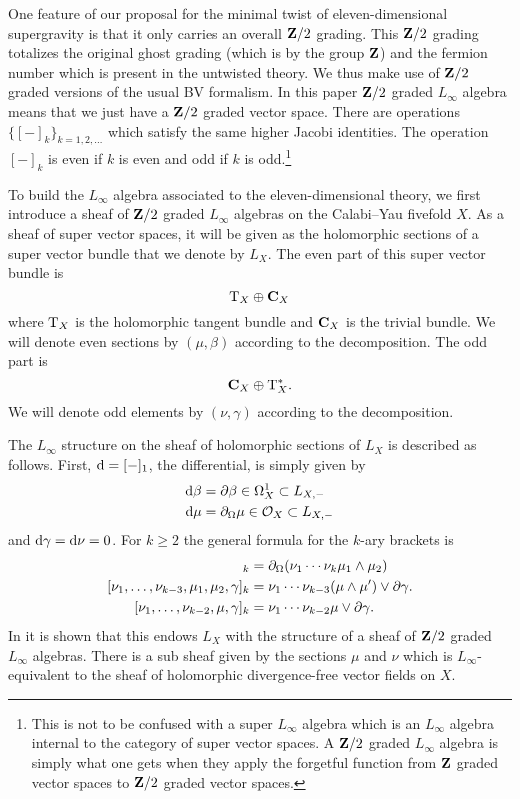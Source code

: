 One feature of our proposal for the minimal twist of eleven-dimensional supergravity is that it only carries an overall $\mathbf{Z}/2$ grading. 
This $\mathbf{Z}/2$ grading totalizes the original ghost grading (which is by the group $\mathbf{Z}$) and the fermion number which is present in the untwisted theory.
We thus make use of $\mathbf{Z}/2$ graded versions of the usual BV formalism.
In this paper $\mathbf{Z}/2$ graded $L_\infty$ algebra means that we just have a $\mathbf{Z}/2$ graded vector space.
There are operations $\{[-]_k\}_{k = 1,2,\ldots}$ which satisfy the same higher Jacobi identities.
The operation $[-]_k$ is even if $k$ is even and odd if $k$ is odd.\footnote{This is not to be confused with a super $L_\infty$ algebra which is an $L_\infty$ algebra internal to the category of super vector spaces.
A $\mathbf{Z}/2$ graded $L_\infty$ algebra is simply what one gets when they apply the forgetful function from $\mathbf{Z}$ graded vector spaces to $\mathbf{Z}/2$ graded vector spaces.}

To build the $L_\infty$ algebra associated to the eleven-dimensional theory, we first introduce a sheaf of $\mathbf{Z}/2$ graded $L_\infty$ algebras on the Calabi--Yau fivefold $X$.
As a sheaf of super vector spaces, it will be given as the holomorphic sections of a super vector bundle that we denote by $L_X$. 
The even part of this super vector bundle is
\[
{\rm T}_X \oplus \mathbf{C}_X 
\]
where ${\rm T}_X$ is the holomorphic tangent bundle and $\mathbf{C}_X$ is the trivial bundle.
We will denote even sections by $(\mu, \beta)$ according to the decomposition. 
The odd part is 
\[
\mathbf{C}_X \oplus {\rm T}^*_X .
\]
We will denote odd elements by $(\nu, \gamma)$ according to the decomposition. 

The $L_\infty$ structure on the sheaf of holomorphic sections of $L_X$ is described as follows. 
First, ${\rm d} = [-]_1$, the differential, is simply given by 
\begin{align*}
{\rm d} \beta & = \partial \beta \in \Omega^1_X \subset L_{X,-} \\
{\rm d} \mu & = \partial_{\Omega} \mu \in \mathcal O_X \subset L_{X, -}
\end{align*}
and ${\rm d} \gamma = {\rm d} \nu = 0$. 
For $k \geq 2$ the general formula for the $k$-ary brackets is 
\begin{align*}
[\nu_1, \ldots, \nu_{k-2}, \mu_1,\mu_2]_{k} & = \div(\nu_1 \cdots \nu_k \mu_1 \wedge \mu_2) \\
[\nu_1,\ldots, \nu_{k-3}, \mu_1,\mu_2,\gamma]_k & = \nu_1 \cdots \nu_{k-3} (\mu \wedge \mu') \vee \del \gamma .\\
[\nu_1,\ldots,\nu_{k-2}, \mu, \gamma]_k & = \nu_1 \cdots \nu_{k-2} \mu \vee \del \gamma .
\end{align*}
In \cite{RSW} it is shown that this endows $L_{X}$ with the structure of a sheaf of $\mathbf{Z}/2$ graded $L_\infty$ algebras.
There is a sub sheaf given by the sections $\mu$ and $\nu$ which is $L_\infty$-equivalent to the sheaf of holomorphic divergence-free vector fields on $X$. 

